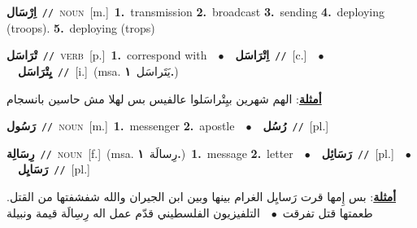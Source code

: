 \documentclass[10pt,a4paper,twoside]{article} %
\begin{document}
\begin{multicols}{2}
{\setlength\topsep{0pt}\textbf{\foreignlanguage{arabic}{اِرْسَال}}\ {\color{gray}\texttt{//}\color{black}}\ \textsc{noun}\ [m.]\ \textbf{1.}~transmission  \textbf{2.}~broadcast  \textbf{3.}~sending  \textbf{4.}~deploying (troops).  \textbf{5.}~deploying (trops)\ } \vspace{2mm}

{\setlength\topsep{0pt}\textbf{\foreignlanguage{arabic}{تْرَاسَل}}\ {\color{gray}\texttt{//}\color{black}}\ \textsc{verb}\ [p.]\ \textbf{1.}~correspond with\ \ $\bullet$\ \ \setlength\topsep{0pt}\textbf{\foreignlanguage{arabic}{اِتْرَاسَل}}\ {\color{gray}\texttt{//}\color{black}}\ [c.]\ \ $\bullet$\ \ \setlength\topsep{0pt}\textbf{\foreignlanguage{arabic}{يِتْرَاسَل}}\ {\color{gray}\texttt{//}\color{black}}\ [i.]\ \color{gray}(msa. \foreignlanguage{arabic}{يَتَراسَل}~\foreignlanguage{arabic}{\textbf{١.}})\color{black}\  \begin{flushright}\color{gray}\foreignlanguage{arabic}{\textbf{\underline{\foreignlanguage{arabic}{أمثلة}}}: الهم شهرين بيِتْراسَلوا عالفيس بس لهلا مش حاسين بانسجام}\end{flushright}\color{black}} \vspace{2mm}

{\setlength\topsep{0pt}\textbf{\foreignlanguage{arabic}{رَسُول}}\ {\color{gray}\texttt{//}\color{black}}\ \textsc{noun}\ [m.]\ \textbf{1.}~messenger  \textbf{2.}~apostle\ \ $\bullet$\ \ \setlength\topsep{0pt}\textbf{\foreignlanguage{arabic}{رُسُل}}\ {\color{gray}\texttt{//}\color{black}}\ [pl.]\ } \vspace{2mm}

{\setlength\topsep{0pt}\textbf{\foreignlanguage{arabic}{رِسَالِة}}\ {\color{gray}\texttt{//}\color{black}}\ \textsc{noun}\ [f.]\ \color{gray}(msa. \foreignlanguage{arabic}{رِسالَة}~\foreignlanguage{arabic}{\textbf{١.}})\color{black}\ \textbf{1.}~message  \textbf{2.}~letter\ \ $\bullet$\ \ \setlength\topsep{0pt}\textbf{\foreignlanguage{arabic}{رَسَائِل}}\ {\color{gray}\texttt{//}\color{black}}\ [pl.]\ \ $\bullet$\ \ \setlength\topsep{0pt}\textbf{\foreignlanguage{arabic}{رَسَايِل}}\ {\color{gray}\texttt{//}\color{black}}\ [pl.]\  \begin{flushright}\color{gray}\foreignlanguage{arabic}{\textbf{\underline{\foreignlanguage{arabic}{أمثلة}}}: بس إِمها قرت رَسايِل الغرام بينها وبين ابن الجيران والله شفشفتها من القتل. طعمتها قتل تفرقت\ $\bullet$\ \  التلفيزيون الفلسطيني قدّم عمل اله رِسِالَة قيمة ونبيلة}\end{flushright}\color{black}} \vspace{2mm}


\end{multicols}
\end{document}
